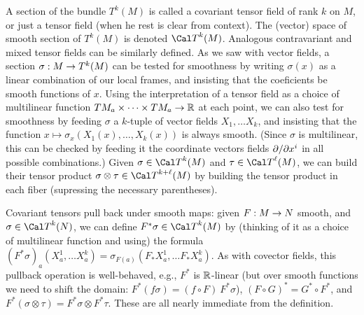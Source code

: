 A section of the bundle $T^k(M)$ is called a covariant tensor field of rank $k$
on $M$, or just a tensor field (when he rest is clear from context).
The (vector) space of smooth section of $T^k(M)$ is denoted ${\Cal T}^k(M)$.
Analogous contravariant and mixed tensor fields can be similarly 
defined. As we saw with vector fields, a section $\sigma:M\rightarrow T^k(M)$ can be
tested for smoothness by writing $\sigma(x)$ as a linear combination
of our local frames, and insisting that the coeficients be smooth
functions of $x$. Using the interpretation of a tensor field as a choice of multilinear
function $TM_a\times \cdots \times TM_a\rightarrow {\Bbb R}$ at each point, we can also 
test for smoothness by feeding $\sigma$ a $k$-tuple of vector fields $X_1,\ldots X_k$,
and insisting that the function $x\mapsto \sigma_x(X_1(x),\ldots ,X_k(x))$ is always smooth.
(Since $\sigma$ is multilinear, this can be checked by feeding it the coordinate
vectors fields $\partial/\partial x^i$ in all possible combinations.) Given 
$\sigma\in {\Cal T}^k(M)$ and $\tau\in {\Cal T}^\ell(M)$, we can build
their tensor product $\sigma\otimes\tau\in {\Cal T}^{k+\ell}(M)$ by building 
the tensor product in each fiber (supressing the necessary parentheses).

\msk

Covariant tensors pull back under smooth maps: given $F:M\rightarrow N$ smooth, and 
$\sigma\in {\Cal T}^k(N)$, we can define $F^*\sigma\in\calt^k(M)$ by
(thinking of it as a choice of multilinear function and using) the formula
$(F^*\sigma)_a(X^1_a,\ldots X^k_a)=\sigma_{F(a)}(F_*X^1_a,\ldots F_*X^k_a)$.
As with covector fields, this pullback operation is well-behaved, e.g., 
$F^*$ is ${\Bbb R}$-linear (but over smooth functions we need to shift the 
domain: $F^*(f\sigma)=(f\circ F)\ F^*\sigma$),
$(F\circ G)^*=G^*\circ F^*$, and $F^*(\sigma\otimes\tau)=F^*\sigma\otimes F^*\tau$.
These are all nearly immediate from the definition.

\ssk

